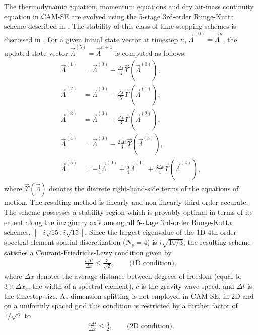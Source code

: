 \documentclass{agujournal}
\begin{document}
The thermodynamic equation, momentum equations and dry air-mass continuity equation in CAM-SE are evolved using the 5-stage 3rd-order Runge-Kutta scheme described in \citet[][ see their equation (56)]{GU2016GMD}.  The stability of this class of time-stepping schemes is discussed in \citet[][ see their section 3.4]{DetAl2015GMD}.  For a given initial state vector at timestep $n$, $\vec{\Lambda}^{(0)} = \vec{\Lambda}^n$, the updated state vector $\vec{\Lambda}^{(5)} = \vec{\Lambda}^{n+1}$ is computed as follows:
\begin{align}
\vec{\Lambda}^{(1)} &= \vec{\Lambda}^{(0)} + \tfrac{\Delta t}{5} \vec{\Upsilon}(\vec{\Lambda}^{(0)}), \nonumber \\
\vec{\Lambda}^{(2)} &= \vec{\Lambda}^{(0)} + \tfrac{\Delta t}{5} \vec{\Upsilon}(\vec{\Lambda}^{(1)}), \nonumber \\
\vec{\Lambda}^{(3)} &= \vec{\Lambda}^{(0)} + \tfrac{\Delta t}{3} \vec{\Upsilon}(\vec{\Lambda}^{(2)}), \\
\vec{\Lambda}^{(4)} &= \vec{\Lambda}^{(0)} + \tfrac{2 \Delta t}{3} \vec{\Upsilon}(\vec{\Lambda}^{(3)}), \nonumber \\
\vec{\Lambda}^{(5)} &= -\tfrac{1}{4} \vec{\Lambda}^{(0)} + \tfrac{5}{4} \vec{\Lambda}^{(1)} + \tfrac{3 \Delta t}{4} \vec{\Upsilon}(\vec{\Lambda}^{(4)}), \nonumber
\end{align} where $\vec{\Upsilon}(\vec{\Lambda})$ denotes the discrete right-hand-side terms of the equations of motion.  The resulting method is linearly and non-linearly third-order accurate. The scheme possesses a stability region which is provably optimal in terms of its extent along the imaginary axis among all 5-stage 3rd-order Runge-Kutta schemes, $[-i\sqrt{15}, i\sqrt{15}]$.  Since the largest eigenvalue of the 1D 4th-order spectral element spatial discretization ($N_p = 4$) is $i \sqrt{10/3}$, the resulting scheme satisfies a Courant-Friedrichs-Lewy condition given by
\begin{align}
\frac{c \Delta t}{\Delta x} \leq \frac{3}{\sqrt{2}}, \qquad \mbox{(1D condition)},
\end{align} where $\Delta x$ denotes the average distance between degrees of freedom (equal to $3 \times \Delta x_e$, the width of a spectral element), $c$ is the gravity wave speed, and $\Delta t$ is the timestep size.  As dimension splitting is not employed in CAM-SE, in 2D and on a uniformly spaced grid this condition is restricted by a further factor of $1/\sqrt{2}$ to
\begin{align}
\frac{c \Delta t}{\Delta x} \leq \frac{3}{2}, \qquad \mbox{(2D condition)}.
\end{align}
%
\end{document}
